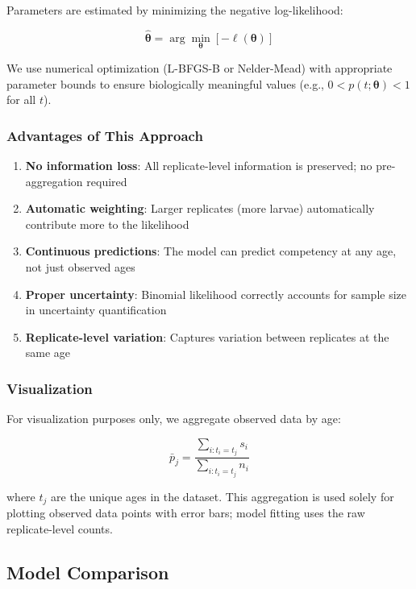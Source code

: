 \documentclass[11pt]{article}
\begin{document}
Parameters are estimated by minimizing the negative log-likelihood:

\begin{equation}
\hat{\boldsymbol{\theta}} = \arg\min_{\boldsymbol{\theta}} \left[ -\ell(\boldsymbol{\theta}) \right]
\end{equation}

We use numerical optimization (L-BFGS-B or Nelder-Mead) with appropriate parameter bounds to ensure biologically meaningful values (e.g., $0 < p(t; \boldsymbol{\theta}) < 1$ for all $t$).

\subsubsection{Advantages of This Approach}

\begin{enumerate}
    \item \textbf{No information loss}: All replicate-level information is preserved; no pre-aggregation required
    \item \textbf{Automatic weighting}: Larger replicates (more larvae) automatically contribute more to the likelihood
    \item \textbf{Continuous predictions}: The model can predict competency at any age, not just observed ages
    \item \textbf{Proper uncertainty}: Binomial likelihood correctly accounts for sample size in uncertainty quantification
    \item \textbf{Replicate-level variation}: Captures variation between replicates at the same age
\end{enumerate}

\subsubsection{Visualization}

For visualization purposes only, we aggregate observed data by age:

\begin{equation}
\bar{p}_j = \frac{\sum_{i: t_i = t_j} s_i}{\sum_{i: t_i = t_j} n_i}
\end{equation}

where $t_j$ are the unique ages in the dataset. This aggregation is used solely for plotting observed data points with error bars; model fitting uses the raw replicate-level counts.

\subsection{Model Comparison}
\end{document}
